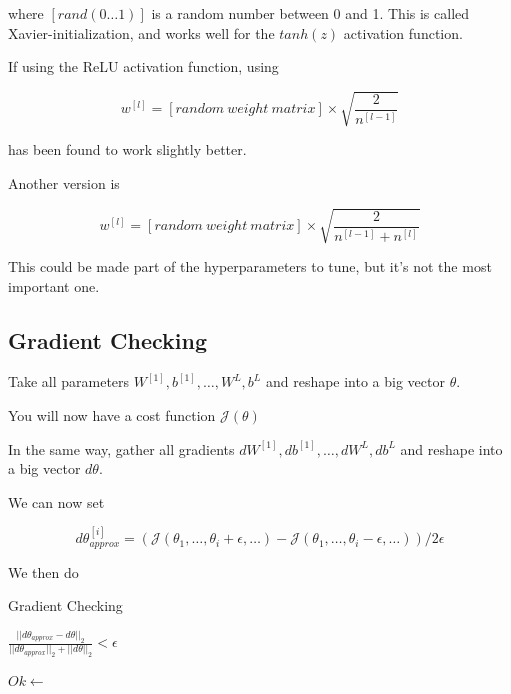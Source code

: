 where $[rand(0 \ldots 1)]$ is a random number between 0 and 1. This is called Xavier-initialization, 
and works well for the $tanh(z)$ activation function.

If using the ReLU activation function, using

\[ 
    w^{[l]} = 
    [random\ weight\ matrix] \times \sqrt{\frac{2}{n^{[l-1]}}} 
\]

has been found to work slightly better.

Another version is

\[
    w^{[l]} =
    [random\ weight\ matrix] \times \sqrt{\frac{2}{n^{[l-1]}+ n^{[l]}}}
\]

This could be made part of the hyperparameters to tune, but it's not the most important one.


\newpage



\subsection*{Gradient Checking}

Take all parameters $W^{[1]} , b^{[1]}, \ldots, W^L, b^L$  and reshape into a big vector $\theta$.

You will now have a cost function $\mathcal{J}(\theta)$

In the same way, gather all gradients $dW^{[1]} , db^{[1]}, \ldots, dW^L, db^L$ and reshape into a big vector $d\theta$.

We can now set

\[ 
    d\theta_{approx}^{[i]} = 
    (
        \mathcal{J}(\theta_1, \ldots, \theta_i + \epsilon, \ldots) 
        - 
        \mathcal{J}(\theta_1, \ldots, \theta_i - \epsilon, \ldots)  
    ) 
    / 
    2\epsilon
\]

We then do

\begin{algorithm}
    \caption*{Gradient Checking}
    \begin{algorithmic}[1]
            \State \Return $\frac{||d\theta_{approx} - d\theta||_2}{||d\theta_{approx}||_2 + ||d\theta||_2} < \epsilon$
        \EndFunction

        \Statex
        
            \State $Ok \gets$ 
        \EndFor
    \end{algorithmic}
\end{algorithm}		



